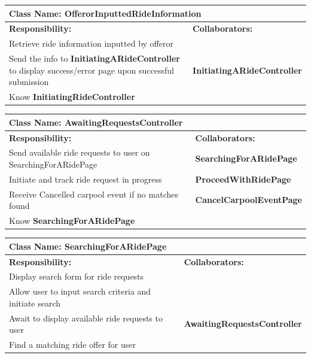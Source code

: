 \documentclass[]{article}
\begin{document}
\begin{table}[H]
    \centering
    \begin{tabular}{|p{5cm}|p{5cm}|}
        \hline
        \multicolumn{2}{|l|}{\textbf{Class Name:} OfferorInputtedRideInformation} \\
        \hline
        \textbf{Responsibility:} & \textbf{Collaborators:} \\
        \hline
        Retrieve ride information inputted by offeror & \phantom{} \\
        \hline
        Send the info to \textbf{InitiatingARideController} to display success/error page upon successful submission & \textbf{InitiatingARideController} \\
        \hline
        Know \textbf{InitiatingRideController}  & \phantom{} \\
    \hline
        \end{tabular}
    \end{table}

\begin{table}[H]
    \centering
    \begin{tabular}{|p{5cm}|p{5cm}|}
        \hline 
        \multicolumn{2}{|l|}{\textbf{Class Name:} AwaitingRequestsController} \\
        \hline
        \textbf{Responsibility:} & \textbf{Collaborators:} \\
        \hline
        Send available ride requests to user on SearchingForARidePage & \textbf{SearchingForARidePage} \\
        \hline
        Initiate and track ride request in progress & \textbf{ProceedWithRidePage} \\
        \hline
        Receive Cancelled carpool event if no matches found & \textbf{CancelCarpoolEventPage} \\
        \hline
        Know \textbf{SearchingForARidePage}  & \phantom{} \\
    \hline
        
    \end{tabular}
\end{table}

\begin{table}[H]
    \centering
    \begin{tabular}{|p{5cm}|p{5cm}|}
        \hline 
        \multicolumn{2}{|l|}{\textbf{Class Name:} SearchingForARidePage} \\
        \hline
        \textbf{Responsibility:} & \textbf{Collaborators:} \\
        \hline
        Display search form for ride requests &  \phantom{} \\
        \hline
        Allow user to input search criteria and initiate search & \phantom{} \\
        \hline
        Await to display available ride requests to user & \textbf{AwaitingRequestsController} \\
        \hline
         Find a matching ride offer for user & \textbf{} \\
        \hline
    \end{tabular}
\end{table}
\end{document}

